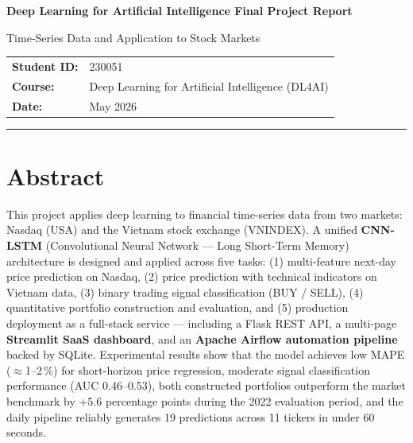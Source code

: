 \documentclass[12pt,a4paper]{article}
\begin{document}
\begin{titlepage}
  \centering
  \vspace*{2cm}
  {\LARGE\bfseries Deep Learning for Artificial Intelligence Final Project Report\par}
  \vspace{0.5cm}
  {\large Time-Series Data and Application to Stock Markets\par}
  \vspace{2cm}
  \begin{tabular}{ll}
    \textbf{Student ID:} & 230051 \\[4pt]
    \textbf{Course:}     & Deep Learning for Artificial Intelligence (DL4AI) \\[4pt]
    \textbf{Date:}       & May 2026 \\
  \end{tabular}
  \vfill
  \hrule
  \vspace{0.3cm}
\end{titlepage}

\tableofcontents
\newpage

\section*{Abstract}

This project applies deep learning to financial time-series data from two markets:
Nasdaq (USA) and the Vietnam stock exchange (VNINDEX). A unified
\textbf{CNN-LSTM} (Convolutional Neural Network --- Long Short-Term Memory)
architecture is designed and applied across five tasks:
(1) multi-feature next-day price prediction on Nasdaq,
(2) price prediction with technical indicators on Vietnam data,
(3) binary trading signal classification (BUY / SELL),
(4) quantitative portfolio construction and evaluation, and
(5) production deployment as a full-stack service --- including a Flask REST API,
a multi-page \textbf{Streamlit SaaS dashboard}, and an \textbf{Apache Airflow
automation pipeline} backed by SQLite.
Experimental results show that the model achieves low MAPE ($\approx$1--2\,\%)
for short-horizon price regression, moderate signal classification performance
(AUC 0.46--0.53), both constructed portfolios outperform the market benchmark by
+5.6 percentage points during the 2022 evaluation period, and the daily pipeline
reliably generates 19 predictions across 11 tickers in under 60 seconds.
\end{document}
